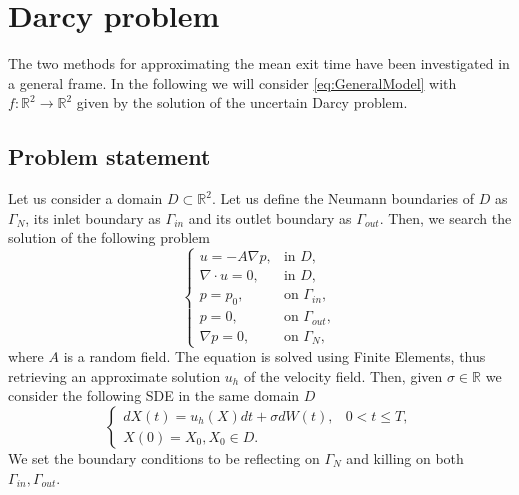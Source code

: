 \section{Darcy problem}
The two methods for approximating the mean exit time have been investigated in a general frame. In the following we will consider \ref{eq:GeneralModel} with $f\colon \mathbb{R}^2 \rightarrow \mathbb{R}^2$ given by the solution of the uncertain Darcy problem. 

\subsection{Problem statement}
Let us consider a domain $D \subset \mathbb{R}^2$. Let us define the Neumann boundaries of $D$ as $\Gamma_N$, its inlet boundary as $\Gamma_{in}$ and its outlet boundary as $\Gamma_{out}$. Then, we search the solution of the following problem
\begin{equation}
	\label{eq:DarcyProblem}
	\begin{cases}
		u = -A \nabla p, & \text{in } D, \\
		\nabla\cdot u = 0, & \text{in } D, \\
		p = p_0, & \text{on } \Gamma_{in},\\
		p = 0, & \text{on } \Gamma_{out}, \\
		\nabla p = 0, & \text{on } \Gamma_N,
	\end{cases}
\end{equation}
where $A$ is a random field. The equation is solved using Finite Elements, thus retrieving an approximate solution $u_h$ of the velocity field. Then, given $\sigma \in \mathbb{R}$ we consider the following SDE in the same domain $D$
\begin{equation}
	\label{eq:GeneralDarcySDE}
	\begin{cases}
		dX(t) = u_h(X) dt + \sigma dW(t), & 0 < t \leq T, \\
		X(0) = X_0, X_0 \in D.
	\end{cases}
\end{equation}
We set the boundary conditions to be reflecting on $\Gamma_N$ and killing on both $\Gamma_{in},\Gamma_{out}$.



